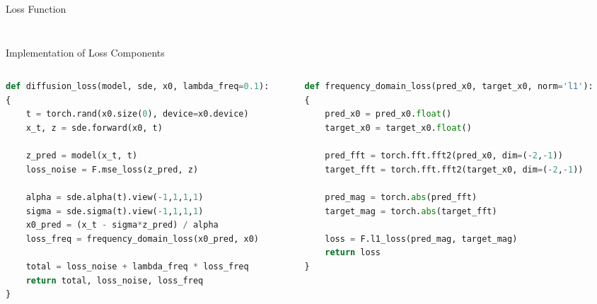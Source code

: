 \documentclass[10pt]{beamer}
\begin{document}
\begin{frame}{Loss Function}
\begin{columns}[T]
\begin{column}{0.45\textwidth}
\begin{figure}
        \end{figure}
    \end{column}
  \end{columns}
\end{frame}

\begin{frame}[fragile]{Implementation of Loss Components}

  \begin{columns}[T]

    \begin{column}{0.5\textwidth}
      \begin{lstlisting}[language=Python,
                            basicstyle=\ttfamily\tiny,
                            numbers=none,
                            frame=single]
def diffusion_loss(model, sde, x0, lambda_freq=0.1):
{
    t = torch.rand(x0.size(0), device=x0.device)
    x_t, z = sde.forward(x0, t)

    z_pred = model(x_t, t)
    loss_noise = F.mse_loss(z_pred, z)

    alpha = sde.alpha(t).view(-1,1,1,1)
    sigma = sde.sigma(t).view(-1,1,1,1)
    x0_pred = (x_t - sigma*z_pred) / alpha
    loss_freq = frequency_domain_loss(x0_pred, x0)

    total = loss_noise + lambda_freq * loss_freq
    return total, loss_noise, loss_freq
}
      \end{lstlisting}
    \end{column}

    \begin{column}{0.5\textwidth}
       \begin{lstlisting}[language=Python,
                            basicstyle=\ttfamily\tiny,
                            numbers=none,
                            frame=single]
def frequency_domain_loss(pred_x0, target_x0, norm='l1'):
{
    pred_x0 = pred_x0.float()
    target_x0 = target_x0.float()

    pred_fft = torch.fft.fft2(pred_x0, dim=(-2,-1))
    target_fft = torch.fft.fft2(target_x0, dim=(-2,-1))

    pred_mag = torch.abs(pred_fft)
    target_mag = torch.abs(target_fft)

    loss = F.l1_loss(pred_mag, target_mag)
    return loss
}
      \end{lstlisting}
    \end{column}

  \end{columns}


\end{frame}
\end{document}
